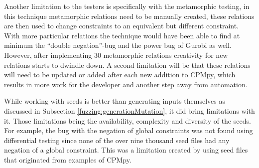 Another limitation to the testers is specifically with the metamorphic testing, in this technique metamorphic relations need to be manually created, these relations are then used to change constraints to an equivalent but different constraint. With more particular relations the technique would have been able to find at minimum the “double negation”-bug and the power bug of Gurobi as well. However, after implementing 30 metamorphic relations creativity for new relations starts to dwindle down. A second limitation will be that these relations will need to be updated or added after each new addition to CPMpy, which results in more work for the developer and another step away from automation.


While working with seeds is better than generating inputs themselves as discussed in Subsection \ref{fuzzing:generationMutation}, it did bring limitations with it. Those limitations being the availability, complexity and diversity of the seeds. For example, the bug with the negation of global constraints was not found using differential testing since none of the over nine thousand seed files had any negation of a global constraint. This was a limitation created by using seed files that originated from examples of CPMpy.




